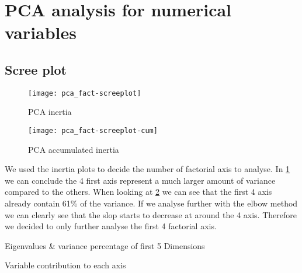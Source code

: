 

\section{PCA analysis for numerical variables}%
\label{sec:pca_analysis_for_numerical_variables}

\subsection{Scree plot}%
\label{sub:scree_plot}


\begin{figure}[H]
    \centering
    \texttt{[image: pca\_fact-screeplot]} %
    \caption{PCA inertia}%
    \label{fig:pca_inertia}
\end{figure}

\begin{figure}[H]
    \centering
    \texttt{[image: pca\_fact-screeplot-cum]} %
    \caption{PCA accumulated inertia}%
    \label{fig:pca_inertia_cum}
\end{figure}

\vspace{-1em}
We used the inertia plots to decide the number of factorial axis to analyse. In
\cref{fig:pca_inertia} we can conclude the 4 first axis represent a much
larger amount of variance compared to the others. When looking at
\cref{fig:pca_inertia_cum} we can see that the first 4 axis already contain 61\%
of the variance. If we analyse further with the elbow method we can clearly see
that the slop starts to decrease at around the 4 axis. Therefore we decided to
only further analyse the first 4 factorial axis.


\begin{table}[H]
    \centering
    \caption{Eigenvalues \& variance percentage of first 5 Dimensions}%
    \label{tab:eig}
    
\end{table}

\begin{table}[H]
    \centering
    \caption{Variable contribution to each axis}%
    \label{tab:}
    
\end{table}

